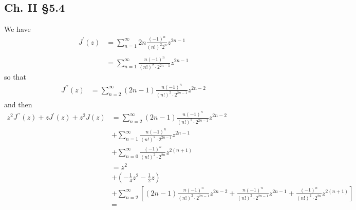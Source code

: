 \documentclass{article}
\begin{document}
\subsection*{Ch. II \S 5.4}
We have
\begin{align*}
   J^\prime(z)
&= \sum_{n=1}^\infty 2n
                   \frac{(-1)^n}{(n!)^2 2^n}
                   z^{2n-1} \\ \\
&= \sum_{n=1}^\infty \frac{n(-1)^n}{(n!)^2 \cdot 2^{2n-1}}
                   z^{2n-1}
\end{align*}
so that
\begin{align*}
   J^{\prime\prime}(z)
&= \sum_{n=2}^\infty (2n-1)
                   \frac{n(-1)^n}{(n!)^2 \cdot 2^{2n-1}}
                   z^{2n-2}
\end{align*}
and then
\begin{align*}
   z^2 J^{\prime\prime}(z) + zJ^\prime(z) + z^2 J(z)
&= \sum_{n=2}^\infty (2n-1)
                   \frac{n(-1)^n}{(n!)^2 \cdot 2^{2n-1}}
                   z^{2n-2} \\
&+ \sum_{n=1}^\infty \frac{n(-1)^n}{(n!)^2 \cdot 2^{2n-1}}
                   z^{2n-1} \\
&+ \sum_{n=0}^\infty \frac{(-1)^n}{(n!)^2 \cdot 2^{2n}}
                   z^{2(n+1)} \\
&= z^2 \\
&+ \left(-\frac{1}{4}z^2 - \frac{1}{2}z\right) \\
&+ \sum_{n=2}^\infty \left[
     (2n-1)
     \frac{n(-1)^n}{(n!)^2 \cdot 2^{2n-1}}
     z^{2n-2}
   + \frac{n(-1)^n}{(n!)^2 \cdot 2^{2n-1}}
     z^{2n-1}
   + \frac{(-1)^n}{(n!)^2 \cdot 2^{2n}}
     z^{2(n+1)}
   \right]\\
&=
\end{align*}


%
\end{document}
